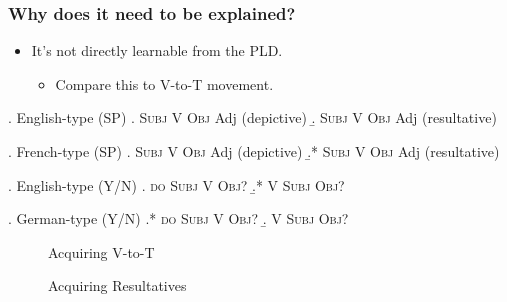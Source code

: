 \documentclass{article}
\begin{document}
\begin{frame}
  \frametitle{Why does it need to be explained?}
  \begin{itemize}
    \item It's not directly learnable from the PLD.
      \begin{itemize}
	\item<3-> Compare this to V-to-T movement.
      \end{itemize}
  \end{itemize}
  \begin{overprint}
    \ex. English-type (SP)
    \a. \textsc{Subj} V \textsc{Obj} Adj (depictive)
    \b. \textsc{Subj} V \textsc{Obj} Adj (resultative)

    \ex. French-type (SP)
    \a. \textsc{Subj} V \textsc{Obj} Adj (depictive)
    \b.* \textsc{Subj} V \textsc{Obj} Adj (resultative)

    \ex. English-type (Y/N)
    \a. \textsc{do Subj} V \textsc{Obj}? 
    \b.* V \textsc{Subj} \textsc{Obj}?

    \ex. German-type (Y/N)
    \a.* \textsc{do Subj} V \textsc{Obj}? 
    \b. V \textsc{Subj} \textsc{Obj}?

    \begin{figure}[h]
      \centering
      \caption{Acquiring V-to-T}
      \label{fig:VtoTAcq}
    \end{figure}
    \begin{figure}[h]
      \centering
      \caption{Acquiring Resultatives}
      \label{fig:resAcq}
    \end{figure}
  \end{overprint}
\end{frame}
\end{document}
